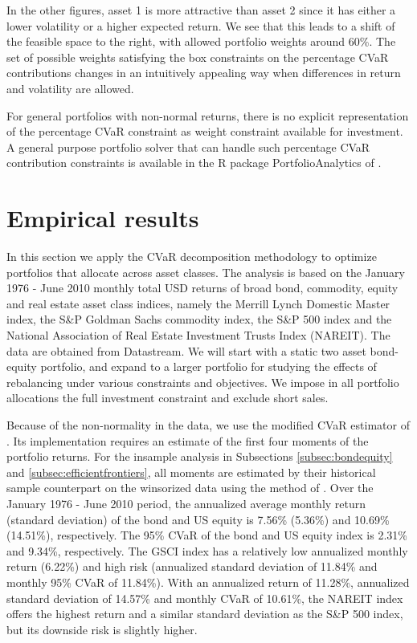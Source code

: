 \documentclass[12pt,a4paper]{article}
\begin{document}
In the other figures, asset 1 is more attractive than asset 2 since it has either a lower volatility or a higher expected return. We see that this leads to a shift of the feasible space to the right, with allowed portfolio weights around 60\%. The set of possible weights satisfying the box constraints on the percentage CVaR contributions changes in an intuitively appealing way when differences in return and volatility are allowed.

For general portfolios with non-normal returns, there is no explicit representation of the percentage CVaR constraint as weight constraint available for investment. A general purpose portfolio solver that can handle such percentage CVaR contribution constraints is available in the R package PortfolioAnalytics of \citet{PortfolioAnalytics}.

\section{Empirical results \label{sec:empiricalresults}}


In this section we apply the CVaR decomposition methodology to optimize portfolios that allocate across asset classes. The analysis is based on the January 1976 - June 2010 monthly total USD returns of broad bond, commodity, equity and real estate asset class indices, namely the Merrill Lynch Domestic Master index,  the S\&P Goldman Sachs commodity index, the S\&P 500 index and the National Association of Real Estate Investment Trusts Index (NAREIT). The data are obtained from Datastream.  We will start with a static two asset bond-equity portfolio, and expand to a larger portfolio for studying the effects of rebalancing under various constraints and objectives. We impose in all portfolio allocations the full investment constraint and exclude short sales.

Because of the non-normality in the data, we use the modified CVaR estimator of \citet{Boudt2007}. Its implementation requires an estimate of the first four moments of the portfolio returns. For the insample analysis in Subsections \ref{subsec:bondequity} and \ref{subsec:efficientfrontiers}, all moments are estimated by their historical sample counterpart on the winsorized data using the method of \citet{Boudt2007}. Over the January 1976 - June 2010 period, the annualized average monthly return (standard deviation) of the bond and US equity is 7.56\% (5.36\%) and 10.69\% (14.51\%), respectively. The 95\% CVaR of the bond and US equity index is 2.31\% and 9.34\%, respectively. The GSCI index has a relatively low annualized monthly return (6.22\%) and high risk (annualized standard deviation of 11.84\% and monthly 95\% CVaR of 11.84\%). With an annualized return of 11.28\%, annualized standard deviation of 14.57\% and monthly CVaR of 10.61\%, the NAREIT index offers the highest return and a similar standard deviation as the S\&P 500 index, but its downside risk is slightly higher.
\end{document}
